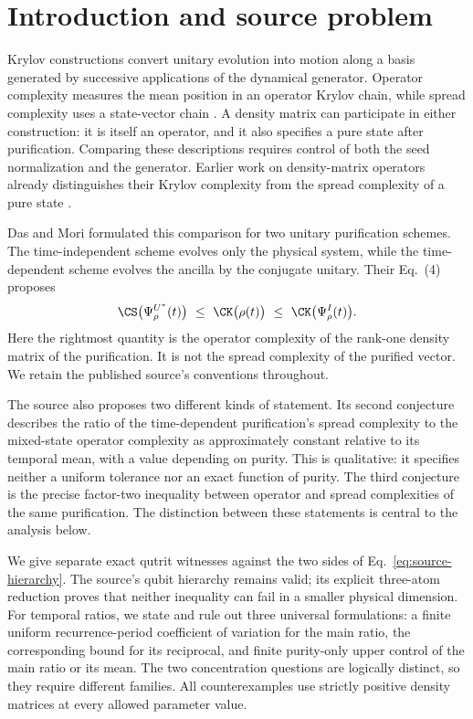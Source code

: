\section{Introduction and source problem}\label{sec:introduction}
Krylov constructions convert unitary evolution into motion along a basis
generated by successive applications of the dynamical generator. Operator
complexity measures the mean position in an operator Krylov chain, while
spread complexity uses a state-vector chain
\cite{Parker2019,Balasubramanian2022}. A density matrix can participate in
either construction: it is itself an operator, and it also specifies a pure
state after purification. Comparing these descriptions requires control of
both the seed normalization and the generator. Earlier work on density-matrix
operators already distinguishes their Krylov complexity from the spread
complexity of a pure state \cite{Caputa2024}.

Das and Mori \cite{DasMori2026} formulated this comparison for two unitary
purification schemes. The time-independent scheme evolves only the physical
system, while the time-dependent scheme evolves the ancilla by the conjugate
unitary. Their Eq.~(4) proposes
\begin{equation}\label{eq:source-hierarchy}
 \CS\bigl(\Psi_\rho^{U^*}(t)\bigr)
 \ \le\ \CK\bigl(\rho(t)\bigr)
 \ \le\ \CK\bigl(\Psi_\rho^I(t)\bigr).
\end{equation}
Here the rightmost quantity is the operator complexity of the rank-one
density matrix of the purification. It is not the spread complexity of the
purified vector. We retain the published source's conventions throughout.

The source also proposes two different kinds of statement. Its second
conjecture describes the ratio of the time-dependent purification's spread
complexity to the mixed-state operator complexity as approximately constant
relative to its temporal mean, with a value depending on purity. This is
qualitative: it specifies neither a uniform tolerance nor an exact function
of purity. The third conjecture is the precise factor-two inequality between
operator and spread complexities of the same purification. The distinction
between these statements is central to the analysis below.

We give separate exact qutrit witnesses against the two sides of
Eq.~\eqref{eq:source-hierarchy}. The source's qubit hierarchy remains valid;
its explicit three-atom reduction proves that neither inequality can fail in
a smaller physical dimension. For temporal ratios, we state and rule out
three universal formulations: a finite uniform recurrence-period coefficient
of variation for the main ratio, the corresponding bound for its reciprocal,
and finite purity-only upper control of the main ratio or its mean. The
two concentration questions are logically distinct, so they require different
families. All counterexamples use strictly positive density matrices at every
allowed parameter value.

